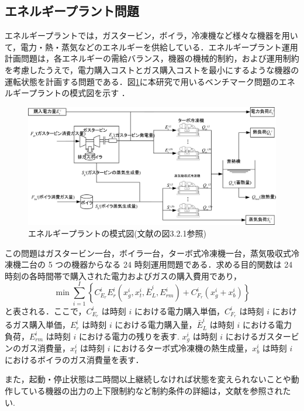 \documentclass[twocolumn]{jarticle}
\begin{document}
    \subsection{エネルギープラント問題}
    エネルギープラントでは，ガスタービン，ボイラ，冷凍機など様々な機器を用いて，電力・熱・蒸気などのエネルギーを供給している．エネルギープラント運用計画問題は，各エネルギーの需給バランス，機器の機械的制約，および運用制約を考慮したうえで，電力購入コストとガス購入コストを最小にするような機器の運転状態を計画する問題である．図\ref{energy_plant}に本研究で用いるベンチマーク問題のエネルギープラントの模式図を示す \cite{denki}．
    \begin{figure}[hbtp]
        \centering
        \includegraphics[keepaspectratio, scale=0.9]
            {energy_plant.png}
        \caption{エネルギープラントの模式図(文献\cite{denki}の図3.2.1参照)}
        \label{energy_plant}
       \end{figure}
    この問題はガスタービン一台，ボイラ一台，ターボ式冷凍機一台，蒸気吸収式冷凍機二台の 5 つの機器からなる 24 時刻運用問題である．求める目的関数は 24 時刻の各時間帯で購入された電力およびガスの購入費用であり，
    \begin{equation}
        \label{fitness}
        \min\sum_{i=1}^I\left\{C_{E_r}^iE_r^i(x_g^i, x_t^i, \bar{E}_L^i, E_{rm}^i) + C_{F_r}^i(x_g^i + x_b^i)\right\}
    \end{equation}
    と表される．ここで，$C_{E_r}^i$ は時刻 $i$ における電力購入単価，$C_{F_r}^i$ は時刻 $i$ におけるガス購入単価，$E_r^i$ は時刻 $i$ における電力購入量，$\bar{E}_L^i$ は時刻 $i$ における電力負荷，$E_{rm}^i$ は時刻 $i$ における電力の残りを表す. $x_g^i$ は時刻 $i$ におけるガスタービンのガス消費量，$x_t^i$ は時刻 $i$ におけるターボ式冷凍機の熱生成量，$x_b^i$ は時刻 $i$ におけるボイラのガス消費量を表す．
    
    また，起動・停止状態は二時間以上継続しなければ状態を変えられないことや動作している機器の出力の上下限制約など制約条件の詳細は，文献\cite{denki}を参照されたい.
\end{document}
